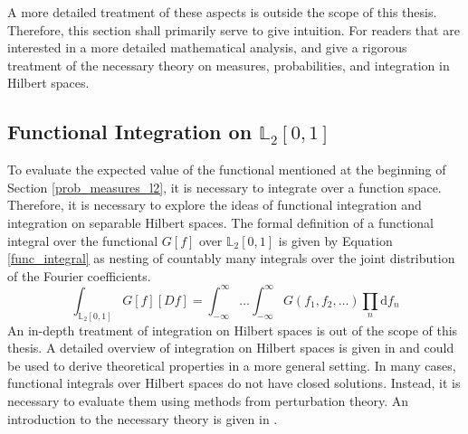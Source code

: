 \documentclass[12pt, a4paper]{article}
\theoremstyle{MAstyle} \newtheorem{assumption}{Assumption}[section]
\theoremstyle{MAstyle} \newtheorem{definition}{Definition}[section]
\theoremstyle{MAstyle} \newtheorem{theorem}{Theorem}[section]
\begin{document}
			A more detailed treatment of these aspects is outside the scope of this thesis. Therefore, this section shall primarily serve to give intuition. For readers that are interested in a more detailed mathematical analysis, \cite{gihman_theory_2004} and \cite{skorohod_integration_1974} give a rigorous treatment of the necessary theory on measures, probabilities, and integration in Hilbert spaces. 
		
		\subsection{Functional Integration on $\mathbb{L}_2[0,1]$}\label{Integration}
			To evaluate the expected value of the functional mentioned at the beginning of Section \ref{prob_measures_l2}, it is necessary to integrate over a function space. Therefore, it is necessary to explore the ideas of functional integration and integration on separable Hilbert spaces. 
			The formal definition of a functional integral over the functional $G[f]$ over $\mathbb{L}_2[0,1]$ is given by Equation \ref{func_integral} as nesting of countably many integrals over the joint distribution of the Fourier coefficients. 
			\begin{equation}\label{func_integral}
				\int_{\mathbb{L}_2[0,1]} G\left[f\right] \left[Df\right] = \int_{-\infty}^{\infty}\dots\int_{-\infty}^{\infty} G\left(f_1, f_2, \dots\right) \prod_{n} \mathrm{d}f_n
			\end{equation}
			An in-depth treatment of integration on Hilbert spaces is out of the scope of this thesis. A detailed overview of integration on Hilbert spaces is given in \cite{skorohod_integration_1974} and could be used to derive theoretical properties in a more general setting. In many cases, functional integrals over Hilbert spaces do not have closed solutions. Instead, it is necessary to evaluate them using methods from perturbation theory. An introduction to the necessary theory is given in \cite{jeribi_perturbation_2021}.\\
			
\end{document}
